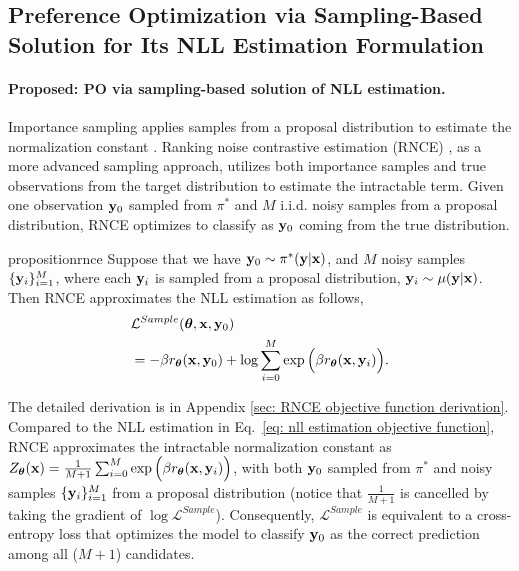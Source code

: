 \subsection{Preference Optimization via Sampling-Based Solution for Its NLL Estimation Formulation}
\label{sec: preference optimization via sampling-based solution}
\paragraph{Proposed: PO via sampling-based solution of NLL estimation.}
Importance sampling applies samples from a proposal distribution to estimate the normalization constant \cite{naesseth2024elementssequentialmontecarlo}.
Ranking noise contrastive estimation (RNCE) \citep{olmin2024connection}, as a more advanced sampling approach, 
utilizes both importance samples and true observations from the target distribution to estimate the intractable term.
Given one observation $\mathbf{y}_0$ sampled from $\pi^{\ast}$
and $M$ i.i.d. noisy samples from a proposal distribution,
RNCE optimizes to classify as $\mathbf{y}_0$ coming from the true distribution.

\begin{restatable}{proposition}{rnce}
\label{prop: ranking noise contrastive estimation objective}
Suppose that we have $\mathbf{y}_0 \sim \pi^{\ast}(\mathbf{y} | \mathbf{x})$,
and $M$ noisy samples $\{\mathbf{y}_i\}_{i=1}^M$,
where each $\mathbf{y}_i$ is sampled from a proposal distribution, $\mathbf{y}_i \sim \mu(\mathbf{y} | \mathbf{x})$.
Then RNCE approximates the NLL estimation as follows,
\begin{align}
\label{eq: ranking noise contrastive estimation}
& \mathcal{L}^{Sample}(\boldsymbol\theta, \mathbf{x}, \mathbf{y}_0)
\\ \nonumber
& =
-
\beta
r_{\boldsymbol\theta}(\mathbf{x}, \mathbf{y}_0)
+
\log
{\sum_{i=0}^M \exp
\Big(
\beta
r_{\boldsymbol\theta}(\mathbf{x}, \mathbf{y}_i)
\Big)}.
\end{align}
\end{restatable}
The detailed derivation is in Appendix \ref{sec: RNCE objective function derivation}.
Compared to the NLL estimation in Eq.~\eqref{eq: nll estimation objective function},
RNCE approximates the intractable normalization constant as $Z_{\boldsymbol\theta}(\mathbf{x})
=
\frac{1}{M+1}
\sum_{i=0}^M \exp
\Big(
\beta
r_{\boldsymbol\theta}(\mathbf{x}, \mathbf{y}_i)
\Big)$,
with both $\mathbf{y}_0$ sampled from $\pi^{\ast}$ and noisy samples $\{\mathbf{y}_i\}_{i=1}^M$ from a proposal distribution (notice that $\frac{1}{M+1}$ is cancelled by taking the gradient of $\log \mathcal{L}^{Sample}$).
Consequently,
$\mathcal{L}^{Sample}$ is equivalent to a cross-entropy loss
that optimizes the model to classify $\mathbf{y}_0$ as the correct prediction among all ($M+1$) candidates.


